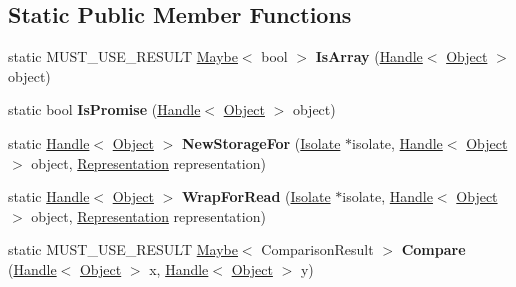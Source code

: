 \subsection*{Static Public Member Functions}
\begin{DoxyCompactItemize}
\item 
static M\+U\+S\+T\+\_\+\+U\+S\+E\+\_\+\+R\+E\+S\+U\+LT \hyperlink{classv8_1_1_maybe}{Maybe}$<$ bool $>$ {\bfseries Is\+Array} (\hyperlink{classv8_1_1internal_1_1_handle}{Handle}$<$ \hyperlink{classv8_1_1internal_1_1_object}{Object} $>$ object)\hypertarget{classv8_1_1internal_1_1_object_aea244e5dbed8840bc5680584365b082d}{}\label{classv8_1_1internal_1_1_object_aea244e5dbed8840bc5680584365b082d}

\item 
static bool {\bfseries Is\+Promise} (\hyperlink{classv8_1_1internal_1_1_handle}{Handle}$<$ \hyperlink{classv8_1_1internal_1_1_object}{Object} $>$ object)\hypertarget{classv8_1_1internal_1_1_object_a0d17da21d7e22d81adbc6391c3c77be1}{}\label{classv8_1_1internal_1_1_object_a0d17da21d7e22d81adbc6391c3c77be1}

\item 
static \hyperlink{classv8_1_1internal_1_1_handle}{Handle}$<$ \hyperlink{classv8_1_1internal_1_1_object}{Object} $>$ {\bfseries New\+Storage\+For} (\hyperlink{classv8_1_1internal_1_1_isolate}{Isolate} $\ast$isolate, \hyperlink{classv8_1_1internal_1_1_handle}{Handle}$<$ \hyperlink{classv8_1_1internal_1_1_object}{Object} $>$ object, \hyperlink{classv8_1_1internal_1_1_representation}{Representation} representation)\hypertarget{classv8_1_1internal_1_1_object_a4ec27010c6dde9b572edde3d6cbed59d}{}\label{classv8_1_1internal_1_1_object_a4ec27010c6dde9b572edde3d6cbed59d}

\item 
static \hyperlink{classv8_1_1internal_1_1_handle}{Handle}$<$ \hyperlink{classv8_1_1internal_1_1_object}{Object} $>$ {\bfseries Wrap\+For\+Read} (\hyperlink{classv8_1_1internal_1_1_isolate}{Isolate} $\ast$isolate, \hyperlink{classv8_1_1internal_1_1_handle}{Handle}$<$ \hyperlink{classv8_1_1internal_1_1_object}{Object} $>$ object, \hyperlink{classv8_1_1internal_1_1_representation}{Representation} representation)\hypertarget{classv8_1_1internal_1_1_object_ad298cb85c34c4199e7eff968e5c5cda6}{}\label{classv8_1_1internal_1_1_object_ad298cb85c34c4199e7eff968e5c5cda6}

\item 
static M\+U\+S\+T\+\_\+\+U\+S\+E\+\_\+\+R\+E\+S\+U\+LT \hyperlink{classv8_1_1_maybe}{Maybe}$<$ Comparison\+Result $>$ {\bfseries Compare} (\hyperlink{classv8_1_1internal_1_1_handle}{Handle}$<$ \hyperlink{classv8_1_1internal_1_1_object}{Object} $>$ x, \hyperlink{classv8_1_1internal_1_1_handle}{Handle}$<$ \hyperlink{classv8_1_1internal_1_1_object}{Object} $>$ y)\hypertarget{classv8_1_1internal_1_1_object_a10f75ddb8e309b5a0a67b6bbcc251349}{}\label{classv8_1_1internal_1_1_object_a10f75ddb8e309b5a0a67b6bbcc251349}


\end{DoxyCompactItemize}
